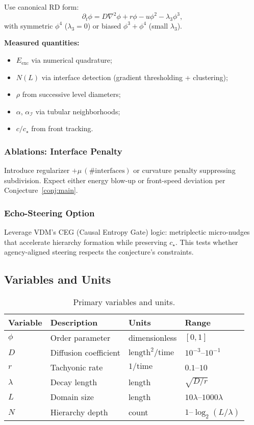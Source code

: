 \documentclass{article}
\begin{document}
Use canonical RD form:
\begin{equation}
\partial_t \phi = D\nabla^2\phi + r\phi - u\phi^2 - \lambda_3 \phi^3,
\label{eq:rd_numerical}
\end{equation}
with symmetric $\phi^4$ ($\lambda_3=0$) or biased $\phi^3+\phi^4$ (small $\lambda_3$).

\textbf{Measured quantities:}
\begin{itemize}
    \item $E_{\text{exc}}$ via numerical quadrature;
    \item $N(L)$ via interface detection (gradient thresholding + clustering);
    \item $\rho$ from successive level diameters;
    \item $\alpha$, $\alpha_\mathcal{I}$ via tubular neighborhoods;
    \item $c/c_\star$ from front tracking.
\end{itemize}

\subsubsection{Ablations: Interface Penalty}

Introduce regularizer $+\mu\,(\text{\#interfaces})$ or curvature penalty suppressing subdivision. Expect either energy blow-up or front-speed deviation per Conjecture~\ref{conj:main}.

\subsubsection{Echo-Steering Option}

Leverage VDM's CEG (Causal Entropy Gate) logic: metriplectic micro-nudges that accelerate hierarchy formation while preserving $c_\star$. This tests whether agency-aligned steering respects the conjecture's constraints.

\subsection{Variables and Units}

\begin{table}[t]
  \centering
  \caption{Primary variables and units.}
  \label{tab:variables}
  \begin{tabular}{@{}llll@{}}
  \toprule
  Variable & Description & Units & Range \\
  \midrule
  $\phi$ & Order parameter & dimensionless & $[0,1]$ \\
  $D$ & Diffusion coefficient & $\text{length}^2/\text{time}$ & $10^{-3}$--$10^{-1}$ \\
  $r$ & Tachyonic rate & $1/\text{time}$ & $0.1$--$10$ \\
  $\lambda$ & Decay length & length & $\sqrt{D/r}$ \\
  $L$ & Domain size & length & $10\lambda$--$1000\lambda$ \\
  $N$ & Hierarchy depth & count & $1$--$\log_2(L/\lambda)$ \\
  \bottomrule
  \end{tabular}
\end{table}
\end{document}
